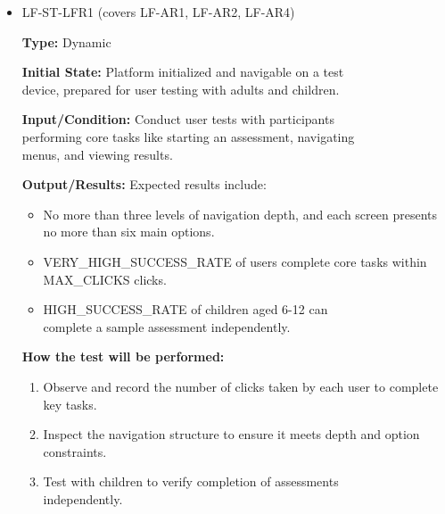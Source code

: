 \documentclass[12pt, titlepage]{article}
\begin{document}
\begin{itemize} 
  \item LF-ST-LFR1 (covers LF-AR1, LF-AR2, LF-AR4) 
  \begin{mdframed}[linewidth=0.5mm] 
    \textbf{Type:} Dynamic \par 
    \textbf{Initial State:} Platform initialized and navigable on a test \\device, prepared for user testing with adults and children. \par 
    \textbf{Input/Condition:} Conduct user tests with participants \\performing core tasks like starting an assessment, navigating \\menus, and viewing results. \par 
    \textbf{Output/Results:} Expected results include: 
    \begin{itemize} 
      \item No more than three levels of navigation depth, and each screen presents no more than six main options. 
      \item VERY\_HIGH\_SUCCESS\_RATE of users complete core tasks within\\
      MAX\_CLICKS clicks. 
      \item HIGH\_SUCCESS\_RATE of children aged 6-12 can \\complete a sample assessment independently. 
    \end{itemize} \par \textbf{How the test will be performed:} 
    \begin{enumerate}[noitemsep] 
      \item Observe and record the number of clicks taken by each user to complete key tasks. 
      \item Inspect the navigation structure to ensure it meets depth and option constraints. 
      \item Test with children to verify completion of assessments \\independently. 
    \end{enumerate} 
  \end{mdframed}


\end{itemize}
\end{document}
